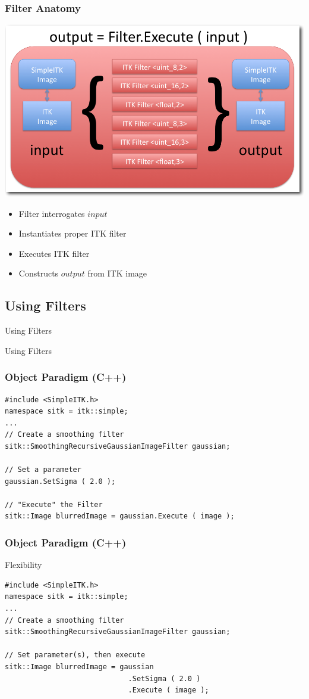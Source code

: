 \begin{frame}[fragile]
\frametitle{Filter Anatomy}
\begin{center}
  \includegraphics[width=.8\textwidth]{Images/FilterInternals_shadow}
\end{center}
\begin{itemize}
  \item Filter interrogates $input$
  \item Instantiates proper ITK filter
  \item Executes ITK filter
  \item Constructs $output$ from ITK image
\end{itemize}
\end{frame}

\subsection{Using Filters}
\begin{frame}{Using Filters}
\fontsize{36pt}{36pt}\selectfont
\center
\begin{center}
Using Filters
\end{center}
\end{frame}

\begin{frame}[fragile]
\frametitle{Object Paradigm (C++)}
\lstcpp
\begin{lstlisting}
#include <SimpleITK.h>
namespace sitk = itk::simple;
...
// Create a smoothing filter
sitk::SmoothingRecursiveGaussianImageFilter gaussian;

// Set a parameter
gaussian.SetSigma ( 2.0 );

// "Execute" the Filter
sitk::Image blurredImage = gaussian.Execute ( image );
\end{lstlisting}
\end{frame}

\begin{frame}[fragile]
\frametitle{Object Paradigm (C++)}
Flexibility
\lstcpp
\begin{lstlisting}
#include <SimpleITK.h>
namespace sitk = itk::simple;
...
// Create a smoothing filter
sitk::SmoothingRecursiveGaussianImageFilter gaussian;

// Set parameter(s), then execute
sitk::Image blurredImage = gaussian
                             .SetSigma ( 2.0 )
                             .Execute ( image );
\end{lstlisting}
\end{frame}

